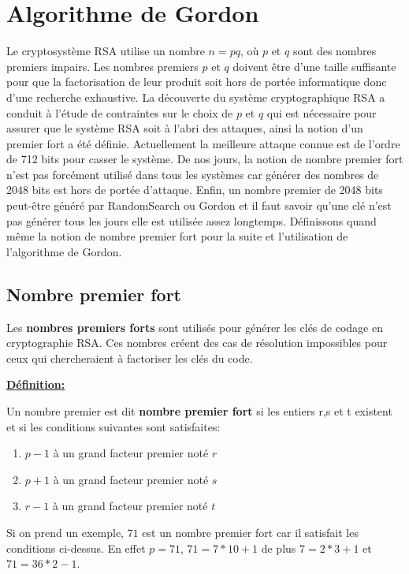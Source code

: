 \section{Algorithme de Gordon}
\label{Algorithme de Gordon}
Le cryptosystème RSA utilise un nombre $n = pq$, où $p$ et $q$ sont des nombres premiers impairs. Les nombres premiers $p$ et $q$ doivent être d’une taille suffisante pour que la factorisation de leur produit soit hors de portée informatique donc d'une recherche exhaustive. La découverte du système cryptographique RSA a conduit à l’étude de contraintes sur le choix de $p$ et $q$ qui est nécessaire pour assurer que le système RSA soit à l’abri des attaques, ainsi la notion d’un premier fort a été définie. Actuellement la meilleure attaque connue est de l'ordre de 712 bits pour casser le système. De nos jours, la notion de nombre premier fort n'est pas forcément utilisé dans tous les systèmes car générer des nombres de 2048 bits est hors de portée d'attaque. Enfin, un nombre premier de 2048 bits peut-être généré par RandomSearch ou Gordon et il faut savoir qu'une clé n'est pas générer tous les jours elle est utilisée assez longtemps. Définissons quand même la notion de nombre premier fort pour la suite et l'utilisation de l'algorithme de Gordon.
\subsection{Nombre premier fort}

Les \textbf{nombres premiers forts} sont utilisés pour générer les clés de codage en cryptographie RSA. Ces nombres créent des cas de résolution impossibles pour ceux qui chercheraient à factoriser les clés du code.

\underline{\textbf{Définition:}}

Un nombre premier est dit \textbf{nombre premier fort} si les entiers r,s et t existent et si les conditions suivantes sont satisfaites:

\begin{enumerate}[label=\arabic*)]
 \item   $ p-1$ à un grand facteur premier noté $r$
 \item   $ p+1$ à un grand facteur premier noté $s$
 \item  $r-1$ à un grand facteur premier noté $t$
\end{enumerate}


Si on prend un exemple, $71$ est un nombre premier fort car il satisfait les conditions ci-dessus. En effet $p=71$, $71=7*10+1$ de plus $7=2*3+1$ et $71=36*2-1$. 

